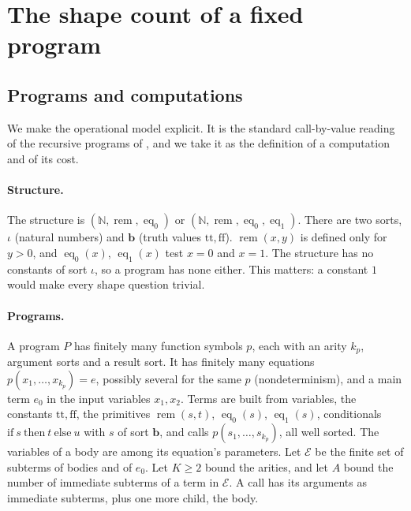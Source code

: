 \documentclass[11pt]{article}
\theoremstyle{remark}
\newcommand{\rem}{\operatorname{rem}}
\newcommand{\eq}{\operatorname{eq}}
\begin{document}
\section{The shape count of a fixed program}

\subsection{Programs and computations}\label{sec:model}
We make the operational model explicit. It is the standard call-by-value
reading of the recursive programs of \cite[\S2A, \S2E]{book}, and we take it
as the definition of a computation and of its cost.

\paragraph{Structure.} The structure is $(\mathbb N,\rem,\eq_0)$ or
$(\mathbb N,\rem,\eq_0,\eq_1)$. There are two sorts, $\iota$ (natural numbers)
and $\mathbf b$ (truth values $\mathrm{tt},\mathrm{ff}$). $\rem(x,y)$ is
defined only for $y>0$, and $\eq_0(x)$, $\eq_1(x)$ test $x=0$ and $x=1$. The
structure has no constants of sort $\iota$, so a program has none either.
This matters: a constant $1$ would make every shape question trivial.

\paragraph{Programs.} A program $P$ has finitely many function symbols
$p$, each with an arity $k_p$, argument sorts and a result sort. It has
finitely many equations $p(x_1,\ldots,x_{k_p})=e$, possibly several for the
same $p$ (nondeterminism), and a main term $e_0$ in the input variables
$x_1,x_2$. Terms are built from variables, the constants
$\mathrm{tt},\mathrm{ff}$, the primitives $\rem(s,t)$, $\eq_0(s)$, $\eq_1(s)$,
conditionals $\mathrm{if}\ s\ \mathrm{then}\ t\ \mathrm{else}\ u$ with $s$ of
sort $\mathbf b$, and calls $p(s_1,\ldots,s_{k_p})$, all well sorted. The
variables of a body are among its equation's parameters. Let $\mathcal E$ be
the finite set of subterms of bodies and of $e_0$. Let $K\geq2$ bound the
arities, and let $A$ bound the number of immediate subterms of a term in
$\mathcal E$. A call has its arguments as immediate subterms, plus one more
child, the body.
\end{document}
